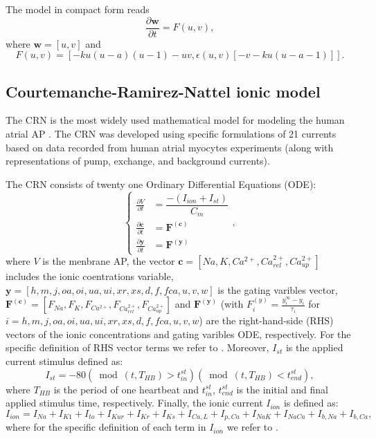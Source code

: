 \documentclass[11pt,a4paper]{article}
\begin{document}
The model in compact form reads
\begin{equation}
\label{AP_compact}
\dfrac{\partial \mathbf{w}}{\partial t} = F(u,v),
\end{equation}
where $\mathbf{w}=[u,v]$ and $$F(u,v)=\left[-ku(u-a)(u-1)-uv,\epsilon(u,v)\left[ -v -ku(u-a-1)\right]\right].$$

\subsection{Courtemanche-Ramirez-Nattel ionic model}\label{subsec:crn}
The CRN is the most widely used mathematical model for modeling the human atrial AP \cite{courtemanche1998ionic}. The CRN was developed using specific formulations of 21 currents based on data recorded from human atrial myocytes experiments (along with representations of pump, exchange, and background currents).

The CRN consists of twenty one Ordinary Differential Equations (ODE):
\begin{equation}
\label{crn}
\begin{cases}
\tfrac{\partial V}{\partial t} &= \dfrac{-(I_{ion}+I_{st})}{C_m} \\
\tfrac{\partial \mathbf{c}}{\partial t} &= \mathbf{F^{(c)}} \\
\tfrac{\partial \mathbf{y}}{\partial t} &= \mathbf{F^{(y)}}
\end{cases},
\end{equation}
where $V$ is the menbrane AP, the vector $\mathbf{c}=[Na, K, Ca^{2+}, Ca^{2+}_{rel}, Ca^{2+}_{up}]$ includes the ionic coentrations variable, $\mathbf{y}=[h, m, j, oa, oi, ua, ui, xr, xs, d, f, fca, u, v, w]$ is the gating varibles vector, $\mathbf{F^{(c)}}=[F_{Na}, F_{K}, F_{Ca^{2+}}, F_{Ca^{2+}_{rel}}, F_{Ca^{2+}_{up}}]$ and $\mathbf{F^{(y)}}$ (with $F_i^{(y)}=\tfrac{y_i^{\infty}-y_i}{\tau_i}$ for $i=h, m, j, oa, oi, ua, ui, xr, xs, d, f, fca, u, v, w$) are the right-hand-side (RHS) vectors of the ionic concentrations and gating varibles ODE, respectively. For the specific definition of RHS vector terms we refer to \cite{courtemanche1998ionic}. Moreover, $I_{st}$ is the applied current stimulus defined as:
$$I_{st} = -80 (\bmod(t,T_{HB}) > t^{st}_{in}) (\bmod(t,T_{HB}) < t^{st}_{end}),$$
where $T_{HB}$ is the period of one heartbeat and $t^{st}_{in}$, $t^{st}_{end}$ is the initial and final applied stimulus time, respectively. Finally, the ionic current $I_{ion}$ is defined as: 
$$I_{ion}=I_{Na}+I_{K1}+I_{to}+I_{Kur}+I_{Kr}+I_{Ks}+I_{Ca,L}+I_{p,Ca}+I_{NaK}+I_{NaCa}+I_{b,Na}+I_{b,Ca},$$
where for the specific definition of each term in $I_{ion}$ we refer to \cite{courtemanche1998ionic}. 
\end{document}
